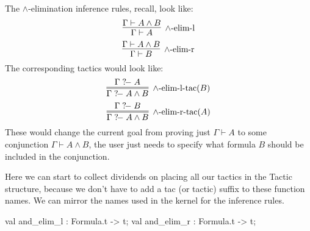 \begin{node}
The $\land$-elimination inference rules, recall, look like:
\begin{equation}
\vcenter{\infer[\land\mbox{-elim-l}]{\Gamma\vdash A}{\Gamma\vdash A\land B}}
\end{equation}
\begin{equation}
\vcenter{\infer[\land\mbox{-elim-r}]{\Gamma\vdash B}{\Gamma\vdash A\land B}}
\end{equation}
The corresponding tactics would look like:
\begin{equation}
\vcenter{\infer=[\land\mbox{-elim-l-tac}(B)]{\Gamma\gdash A\land B}{\Gamma\gdash A}}
\end{equation}
\begin{equation}
\vcenter{\infer=[\land\mbox{-elim-r-tac}(A)]{\Gamma\gdash A\land B}{\Gamma\gdash B}}
\end{equation}
These would change the current goal from proving just $\Gamma\vdash A$
to some conjunction $\Gamma\vdash A\land B$, the user just needs to
specify what formula $B$ should be included in the conjunction.

Here we can start to collect dividends on placing all our tactics in
the {\Tt{}Tactic\nwendquote} structure, because we don't have to add a {\Tt{}{\_}tac\nwendquote} (or
{\Tt{}{\_}tactic\nwendquote}) suffix to these function names. We can mirror the names
used in the kernel for the inference rules.
\end{node}

\nwenddocs{}\plusendmoddef\nwstartdeflinemarkup{}\nwenddeflinemarkup
val and_elim_l : Formula.t -> t;
val and_elim_r : Formula.t -> t;
\nwendcode{}\nwdocspar

